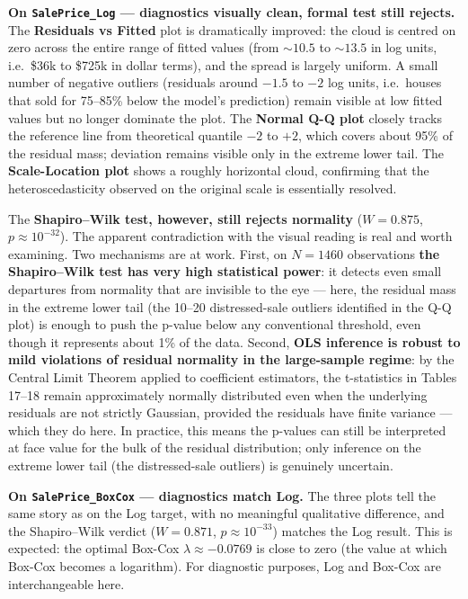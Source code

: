 \textbf{On \texttt{SalePrice\_Log} --- diagnostics visually clean,
formal test still rejects.} The \textbf{Residuals vs Fitted} plot is
dramatically improved: the cloud is centred on zero across the entire
range of fitted values (from \(\sim 10.5\) to \(\sim 13.5\) in log
units, i.e.~\$36k to \$725k in dollar terms), and the spread is largely
uniform. A small number of negative outliers (residuals around \(-1.5\)
to \(-2\) log units, i.e.~houses that sold for 75--85\% below the
model's prediction) remain visible at low fitted values but no longer
dominate the plot. The \textbf{Normal Q-Q plot} closely tracks the
reference line from theoretical quantile \(-2\) to \(+2\), which covers
about 95\% of the residual mass; deviation remains visible only in the
extreme lower tail. The \textbf{Scale-Location plot} shows a roughly
horizontal cloud, confirming that the heteroscedasticity observed on the
original scale is essentially resolved.

The \textbf{Shapiro--Wilk test, however, still rejects normality}
(\(W = 0.875\), \(p \approx 10^{-32}\)). The apparent contradiction with
the visual reading is real and worth examining. Two mechanisms are at
work. First, on \(N = 1460\) observations \textbf{the Shapiro--Wilk test
has very high statistical power}: it detects even small departures from
normality that are invisible to the eye --- here, the residual mass in
the extreme lower tail (the 10--20 distressed-sale outliers identified
in the Q-Q plot) is enough to push the p-value below any conventional
threshold, even though it represents about 1\% of the data. Second,
\textbf{OLS inference is robust to mild violations of residual normality
in the large-sample regime}: by the Central Limit Theorem applied to
coefficient estimators, the t-statistics in Tables 17--18 remain
approximately normally distributed even when the underlying residuals
are not strictly Gaussian, provided the residuals have finite variance
--- which they do here. In practice, this means the p-values can still
be interpreted at face value for the bulk of the residual distribution;
only inference on the extreme lower tail (the distressed-sale outliers)
is genuinely uncertain.

\textbf{On \texttt{SalePrice\_BoxCox} --- diagnostics match Log.} The
three plots tell the same story as on the Log target, with no meaningful
qualitative difference, and the Shapiro--Wilk verdict (\(W = 0.871\),
\(p \approx 10^{-33}\)) matches the Log result. This is expected: the
optimal Box-Cox \(\lambda \approx -0.0769\) is close to zero (the value
at which Box-Cox becomes a logarithm). For diagnostic purposes, Log and
Box-Cox are interchangeable here.

